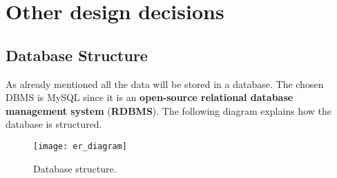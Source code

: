 \clearpage

\section{Other design decisions}
\subsection{Database Structure}
As already mentioned all the data will be stored in a database. The chosen DBMS is MySQL since it is an \textbf{open-source relational database management system} (\textbf{RDBMS}).\newline
The following diagram explains how the database is structured.
\begin{figure}[H]
	\centering
	\texttt{[image: er\_diagram]}
	\caption{Database structure.}
	\label{fig:er_diagram}
\end{figure}
